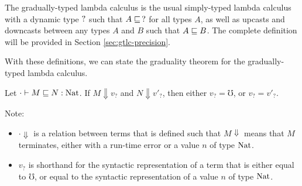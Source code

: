 The gradually-typed lambda calculus is the usual simply-typed lambda calculus with a dynamic
type $?$ such that $A \sqsubseteq\, ?$ for all types $A$, as well as upcasts and downcasts
between any types $A$ and $B$ such that $A \sqsubseteq B$. The complete definition will be provided in
Section \ref{sec:gtlc-precision}.

With these definitions, we can state the graduality theorem for the gradually-typed lambda calculus.


\begin{theorem}[Graduality]
  Let $\cdot \vdash M \sqsubseteq N : \text{Nat}$. 
  If $M \Downarrow v_?$ and $N \Downarrow v'_?$, then either $v_? = \mho$, or $v_? = v'_?$.
\end{theorem}

Note:
\begin{itemize}

  \item $\cdot \Downarrow$ is a relation between terms that is defined such that $M \Downarrow$ means
  that $M$ terminates, either with a run-time error or a value $n$ of type $\text{Nat}$.

  \item $v_?$ is shorthand for the syntactic representation of a term that is either equal to
  $\mho$, or equal to the syntactic representation of a value $n$ of type $\text{Nat}$.
\end{itemize}


